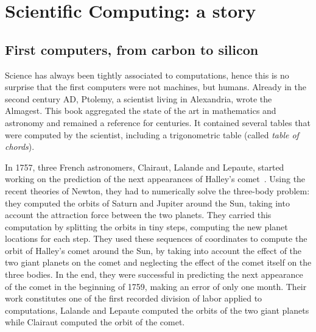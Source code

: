 \chapter{Scientific Computing: a story}
\label{chapter:context}

    \section{First computers, from carbon to silicon}%
    \label{sec:first_computers}

        Science has always been tightly associated to computations, hence this is no surprise that the first computers
        were not machines, but humans. Already in the second century AD, Ptolemy, a scientist living in Alexandria,
        wrote the Almagest. This book aggregated the state of the art in mathematics and astronomy and remained a
        reference for centuries. It contained several tables that were computed by the scientist, including a
        trigonometric table (called \emph{table of chords}).

        In 1757, three French astronomers, Clairaut, Lalande and Lepaute, started working on the prediction of the next
        appearances of Halley's comet~\cite[Chapter~1]{human_computers}. Using the recent theories of Newton, they had
        to numerically solve the three-body problem: they computed the orbits of Saturn and Jupiter around the Sun,
        taking into account the attraction force between the two planets. They carried this computation by splitting the
        orbits in tiny steps, computing the new planet locations for each step. They used these sequences of coordinates
        to compute the orbit of Halley's comet around the Sun, by taking into account the effect of the two giant
        planets on the comet and neglecting the effect of the comet itself on the three bodies. In the end, they were successful in
        predicting the next appearance of the comet in the beginning of 1759, making an error of only one month. Their
        work constitutes one of the first recorded division of labor applied to computations, Lalande and Lepaute
        computed the orbits of the two giant planets while Clairaut computed the orbit of the comet.

